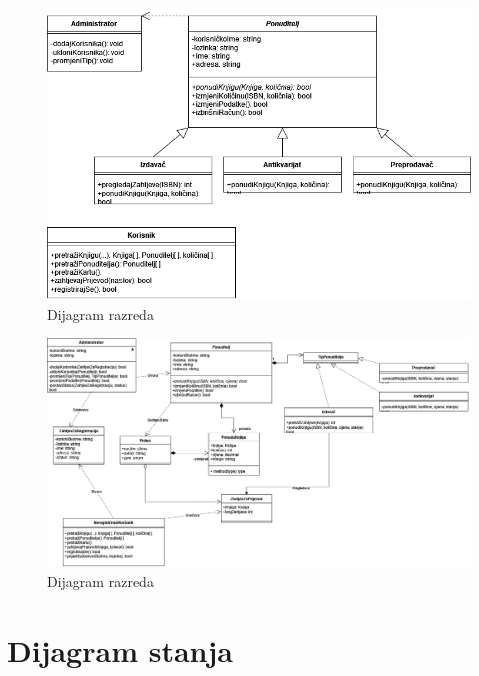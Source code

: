 				\begin{figure}[H]
				\includegraphics[width=\textwidth]{dijagrami/UML dijagram razreda v1.PNG} %
				\centering
				\caption{Dijagram razreda}
				\label{fig:razred1}
			\end{figure}
			
			\eject
			
						
			
			
			\begin{figure}[H]
				\includegraphics[width=\textwidth]{dijagrami/UML dijagram razreda v2.PNG} %
				\centering
				\caption{Dijagram razreda}
				\label{fig:razred2}
			\end{figure}
			
			
			\eject
		
		\section{Dijagram stanja}
			
